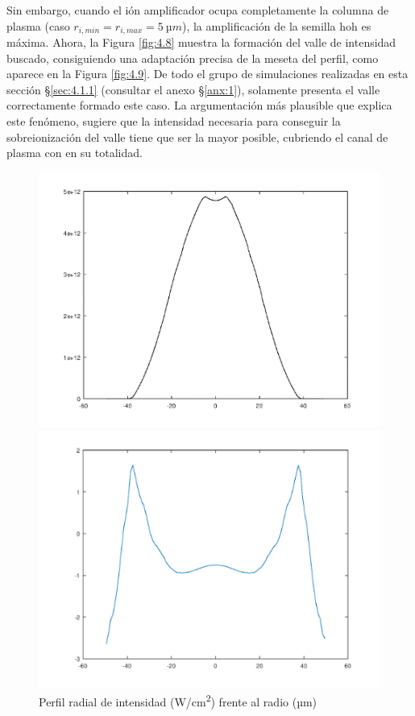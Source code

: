 Sin embargo, cuando el ión amplificador ocupa completamente la columna de plasma (caso $r_{i,min}=r_{i,max}=\qty{5}{µm}$), la amplificación de la semilla \acrshort{hoh} es máxima. Ahora, la Figura \ref{fig:4.8} muestra la formación del valle de intensidad buscado, consiguiendo una adaptación precisa de la meseta del perfil, como aparece en la Figura \ref{fig:4.9}. De todo el grupo de simulaciones realizadas en esta sección \S\ref{sec:4.1.1} (consultar el anexo \S\ref{anx:1}), solamente presenta el valle correctamente formado este caso. La argumentación más plausible que explica este fenómeno, sugiere que la intensidad necesaria para conseguir la sobreionización del valle tiene que ser la mayor posible, cubriendo el canal de plasma con  en su totalidad.

\begin{figure}[htbp]
  \centering
  \begin{subcaptionblock}{.4\textwidth}
    \centering
    \includegraphics[width=\textwidth]{Figuras/ch4_int05.png}
    \caption{Perfil radial de intensidad (\unit{W/cm^2}) frente al radio (\unit{µm})}\label{fig:ch4_int05}
  \end{subcaptionblock}
  \begin{subcaptionblock}{.4\textwidth}
    \centering
    \includegraphics[width=\textwidth]{Figuras/ch4_fs05.png}

\end{subcaptionblock}
\end{figure}
